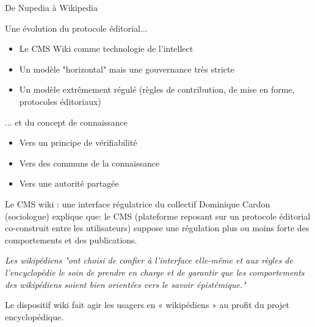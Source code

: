 \begin{frame}{De Nupedia à Wikipedia}
    \begin{block}{Une évolution du protocole éditorial...}
        \begin{itemize}
            \item Le CMS Wiki comme technologie de l'intellect
            \item Un modèle "horizontal" mais une gouvernance très stricte
            \item Un modèle extrêmement régulé (règles de contribution, de mise en forme, protocoles éditoriaux)
        \end{itemize}
    \end{block}

    \begin{block}{... et du concept de connaissance}
        \begin{itemize}
            \item Vers un principe de vérifiabilité
            \item Vers des communs de la connaissance
            \item Vers une autorité partagée
        \end{itemize}
    \end{block}
\end{frame}

\begin{frame}{Le CMS wiki : une interface régulatrice du collectif}
   Dominique Cardon (sociologue) explique que: le CMS (plateforme reposant sur un protocole éditorial co-construit entre les utilisateurs) suppose une régulation plus ou moins forte des comportements et des publications.\\
\begin{block}{}
\centering
     \textit{Les wikipédiens "ont choisi de confier à l’interface elle-même et aux règles de l’encyclopédie le soin de prendre en charge et de garantir que les comportements des wikipédiens soient bien orientées vers le savoir épistémique."}
\end{block}

\textrightarrow{} Le dispositif wiki fait agir les usagers en « wikipédiens » au profit du projet encyclopédique. 
\end{frame}

